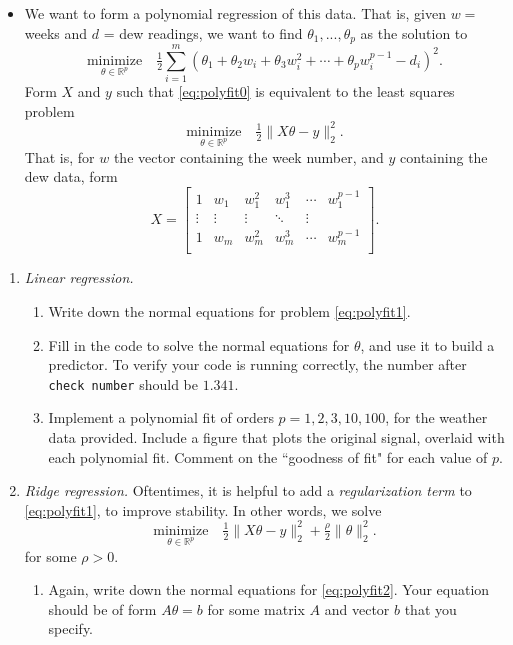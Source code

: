 \documentclass{article}
\newcommand{\bmat}{\left[\begin{matrix}}
\newcommand{\emat}{\end{matrix}\right]}
\begin{document}
\begin{enumerate}
\begin{itemize}
\item We want to form a polynomial regression of this data. That is, given $w = $ weeks and $d$ = dew readings, we want to find $\theta_1,...,\theta_p$ as the solution to
\begin{equation}
\underset{\theta\in \mathbb R^p}{\text{minimize}} \quad \tfrac{1}{2}\sum_{i=1}^m (\theta_1 + \theta_2 w_i + \theta_3 w_i^2 + \cdots + \theta_{p} w_i^{p-1} - d_i)^2.
\label{eq:polyfit0}
\end{equation}
Form $X$ and $y$ such that \eqref{eq:polyfit0} is equivalent to the least squares problem
\begin{equation}
\underset{\theta\in \mathbb R^p}{\text{minimize}} \quad \tfrac{1}{2}\|X\theta - y\|_2^2.
\label{eq:polyfit1}
\end{equation}
That is, for $w$ the vector containing the week number, and $y$ containing the dew data, form 
\[
X = \bmat
1 & w_1 & w_1^2&  w_1^3 &\cdots &w_1^{p-1}\\
\vdots& \vdots & \vdots & \ddots & \vdots\\
1 & w_m & w_m^2&  w_m^3 &\cdots &w_m^{p-1}\\
\emat.
\]

\end{itemize}
\begin{enumerate}
\item \emph{Linear regression.}
\begin{enumerate}
\item Write down the normal equations for problem \eqref{eq:polyfit1}. 

\item Fill in the code to solve the normal equations for $\theta$, and use it to build a predictor.
To verify your code is running correctly, the number after \texttt{check number} should be   $1.341$.


\item Implement a polynomial fit of orders $p = 1,2,3,10,100$, for the weather data provided. Include a figure that plots the original signal, overlaid with each polynomial fit. Comment on the ``goodness of fit" for each value of $p$.



\end{enumerate}
\item \emph{Ridge regression.} Oftentimes, it is helpful to add a \emph{regularization term} to \eqref{eq:polyfit1}, to improve stability.  In other words, we solve 
\begin{equation}
\underset{\theta\in \mathbb R^p} {\text{minimize}}\quad \tfrac{1}{2}\|X\theta - y\|_2^2 + \tfrac{\rho}{2} \|\theta\|_2^2.
\label{eq:polyfit2}
\end{equation}
for some $\rho > 0$. 
\begin{enumerate}
\item Again, write down the normal equations for \eqref{eq:polyfit2}. Your equation should be of form $A\theta =b$ for some matrix $A$ and vector $b$ that you specify.




\end{enumerate}
\end{enumerate}
\end{enumerate}
\end{document}

